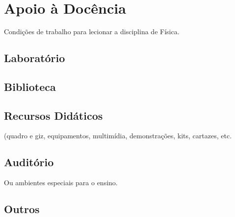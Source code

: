 \chapter{Apoio à Docência}
\label{cap: apoioDocencia}

Condições de trabalho para lecionar a disciplina de Física.

\section{Laboratório}
\section{Biblioteca}
\section{Recursos Didáticos}
(quadro e giz, equipamentos, multimídia, demonstrações, kits,
cartazes, etc.
\section{Auditório}
Ou ambientes especiais para o ensino.
\section{Outros}